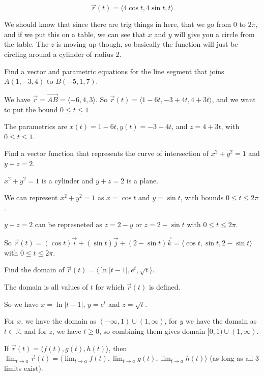 \documentclass[../calc3.tex]{subfiles}
\begin{document}
\begin{example}
    \[ \vec{r}(t) = \langle 4\cos t, 4\sin t, t\rangle \]

    We should know that since there are trig things in here, that we go from $0$ to $2\pi$, and if we put this on a table, we can see that $x$ and $y$ will give you a circle from the table. The $z$ is moving up though, so basically the function will just be circling around a cylinder of radius $2$.
\end{example}
\medbreak
\begin{example}
    Find a vector and parametric equations for the line segment that joins $A(1,-3,4)$ to $B(-5,1,7)$.

    We have $\vec{r}=\vec{AB}=\langle -6,4,3\rangle$. So $\vec{r}(t)=\langle 1-6t,-3+4t,4+3t\rangle$, and we want to put the bound $0\leq t\leq 1$

    The parametrics are $x(t)=1-6t, y(t)=-3+4t$, and $z=4+3t$, with $0\leq t\leq 1$.
\end{example}

\begin{example}
    Find a vector function that represents the curve of intersection of $x^2+y^2=1$ and $y+z=2$.

    $x^2+y^2=1$ is a cylinder and $y+z=2$ is a plane.

    We can represent $x^2+y^2=1$ as $x=\cos t$ and $y=\sin t$, with bounds $0\leq t\leq 2\pi$.

    $y+z=2$ can be represneted as $z=2-y$ or $z=2-\sin t$ with $0\leq t\leq 2\pi$.

    So $\vec{r}(t)=(\cos t)\vec{i}+(\sin t)\vec{j}+(2-\sin t)\vec{k} = \langle \cos t, \sin t, 2-\sin t\rangle$ with $0\leq t\leq 2\pi$.
\end{example}

\begin{example}
    Find the domain of $\vec{r}(t)=\langle \ln|t-1|, e^t, \sqrt{t}\rangle$.

    The domain is all values of $t$ for which $\vec{r}(t)$ is defined.

    So we have $x=\ln |t-1|$, $y=e^t$ and $z=\sqrt{t}$.

    For $x$, we have the domain as $(-\infty, 1)\cup (1,\infty)$, for $y$ we have the domain as $t\in \mathbb{R}$, and for $z$, we have $t\geq 0$, so combining them gives domain $[0,1)\cup (1,\infty)$.  
\end{example}

\begin{definition}
    If $\vec{r}(t)=\langle f(t),g(t),h(t)\rangle$, then $\lim_{t\to a}\vec{r}(t)=\langle \lim_{t\to a}f(t),\lim_{t\to a}g(t),\lim_{t\to a}h(t)\rangle$ (as long as all 3 limits exist).
\end{definition}
\end{document}
